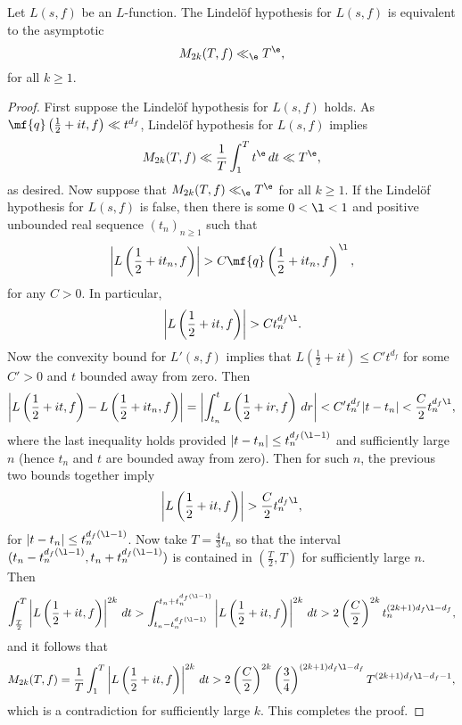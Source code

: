     \begin{proposition}
      Let $L(s,f)$ be an $L$-function. The Lindel\"of hypothesis for $L(s,f)$ is equivalent to the asymptotic
      \[
        M_{2k}(T,f) \ll_{\e} T^{\e},
      \]
      for all $k \ge 1$.
    \end{proposition}
    \begin{proof}
      First suppose the Lindel\"of hypothesis for $L(s,f)$ holds. As $\mf{q}\left(\frac{1}{2}+it,f\right) \ll t^{d_{f}}$, Lindel\"of hypothesis for $L(s,f)$ implies
      \[
        M_{2k}(T,f) \ll \frac{1}{T}\int_{1}^{T}t^{\e}\,dt \ll T^{\e},
      \]
      as desired. Now suppose that $M_{2k}(T,f) \ll_{\e} T^{\e}$ for all $k \ge 1$. If the Lindel\"of hypothesis for $L(s,f)$ is false, then there is some $0 < \l < 1$ and positive unbounded real sequence $(t_{n})_{n \ge 1}$ such that
      \[
        \left|L\left(\frac{1}{2}+it_{n},f\right)\right| > C\mf{q}\left(\frac{1}{2}+it_{n},f\right)^{\l},
      \]
      for any $C > 0$. In particular,
       \[
        \left|L\left(\frac{1}{2}+it,f\right)\right| > Ct_{n}^{d_{f}\l}.
      \]
      Now the convexity bound for $L'(s,f)$ implies that $L\left(\frac{1}{2}+it\right) \le C't^{d_{f}}$ for some $C' > 0$ and $t$ bounded away from zero. Then
      \[
        \left|L\left(\frac{1}{2}+it,f\right)-L\left(\frac{1}{2}+it_{n},f\right)\right| = \left|\int_{t_{n}}^{t}L\left(\frac{1}{2}+ir,f\right)\,dr\right| < C't_{n}^{d_{f}}|t-t_{n}| < \frac{C}{2}t_{n}^{d_{f}\l},
      \]
      where the last inequality holds provided $|t-t_{n}| \le t_{n}^{d_{f}(\l-1)}$ and sufficiently large $n$ (hence $t_{n}$ and $t$ are bounded away from zero). Then for such $n$, the previous two bounds together imply
      \[
        \left|L\left(\frac{1}{2}+it,f\right)\right| > \frac{C}{2}t_{n}^{d_{f}\l},
      \]
      for $|t-t_{n}| \le t_{n}^{d_{f}(\l-1)}$. Now take $T = \frac{4}{3}t_{n}$ so that the interval $(t_{n}-t_{n}^{d_{f}(\l-1)},t_{n}+t_{n}^{d_{f}(\l-1)})$ is contained in $\left(\frac{T}{2},T\right)$ for sufficiently large $n$. Then
      \[
        \int_{\frac{T}{2}}^{T}\left|L\left(\frac{1}{2}+it,f\right)\right|^{2k}\,dt > \int_{t_{n}-t_{n}^{d_{f}(\l-1)}}^{t_{n}+t_{n}^{d_{f}(\l-1)}}\left|L\left(\frac{1}{2}+it,f\right)\right|^{2k}\,dt > 2\left(\frac{C}{2}\right)^{2k}t_{n}^{(2k+1)d_{f}\l-d_{f}},
      \]
      and it follows that
      \[
        M_{2k}(T,f) = \frac{1}{T}\int_{1}^{T}\left|L\left(\frac{1}{2}+it,f\right)\right|^{2k}\,dt > 2\left(\frac{C}{2}\right)^{2k}\left(\frac{3}{4}\right)^{(2k+1)d_{f}\l-d_{f}}T^{(2k+1)d_{f}\l-d_{f}-1},
      \]
      which is a contradiction for sufficiently large $k$. This completes the proof.
      \end{proof}
  \section{}